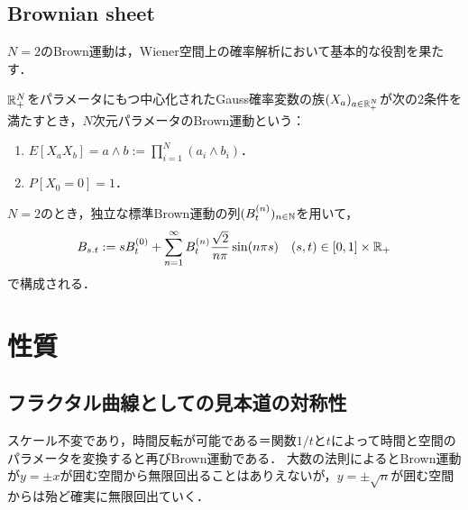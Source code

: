 \documentclass[uplatex,dvipdfmx]{jsreport}
\begin{document}
\subsection{Brownian sheet}

\begin{tcolorbox}[colframe=ForestGreen, colback=ForestGreen!10!white,breakable,colbacktitle=ForestGreen!40!white,coltitle=black,fonttitle=\bfseries\sffamily,
title=]
    $N=2$のBrown運動は，Wiener空間上の確率解析において基本的な役割を果たす．
\end{tcolorbox}

\begin{definition}
    $\mathbb{R}_+^N$をパラメータにもつ中心化されたGauss確率変数の族$(X_a)_{a\in\mathbb{R}_+^N}$が次の2条件を満たすとき，$N$次元パラメータのBrown運動という：
    \begin{enumerate}
        \item $E[X_aX_b]=a\land b:=\prod_{i=1}^N(a_i\land b_i)$．
        \item $P[X_0=0]=1$．
    \end{enumerate}
\end{definition}
\begin{proposition}
    $N=2$のとき，独立な標準Brown運動の列$(B_t^{(n)})_{n\in\mathbb{N}}$を用いて，
    \[B_{s.t}:=sB_t^{(0)}+\sum_{n=1}^\infty B_t^{(n)}\frac{\sqrt{2}}{n\pi}\sin(n\pi s)\quad(s,t)\in[0,1]\times\mathbb{R}_+\]
    で構成される．
\end{proposition}

\section{性質}

\subsection{フラクタル曲線としての見本道の対称性}

\begin{tcolorbox}[colframe=ForestGreen, colback=ForestGreen!10!white,breakable,colbacktitle=ForestGreen!40!white,coltitle=black,fonttitle=\bfseries\sffamily,
title=]
    スケール不変であり，時間反転が可能である＝関数$1/t$と$t$によって時間と空間のパラメータを変換すると再びBrown運動である．
    大数の法則によるとBrown運動が$y=\pm x$が囲む空間から無限回出ることはありえないが，$y=\pm\sqrt{n}$が囲む空間からは殆ど確実に無限回出ていく．
\end{tcolorbox}
\end{document}
